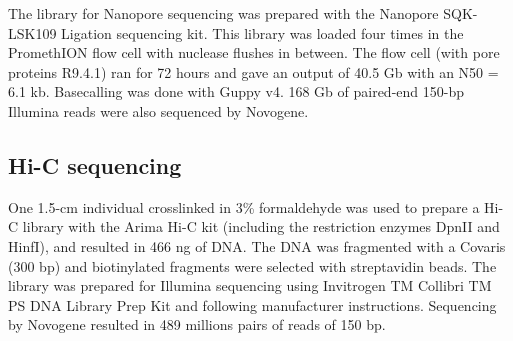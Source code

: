 The library for Nanopore sequencing was prepared with the Nanopore SQK-LSK109 Ligation sequencing kit. This library was loaded four times in the PromethION flow cell with nuclease flushes in between. The flow cell (with pore proteins R9.4.1) ran for 72 hours and gave an output of 40.5 Gb with an N50 = 6.1 kb. Basecalling was done with Guppy v4. 168 Gb of paired-end 150-bp Illumina reads were also sequenced by Novogene.




\subsection{Hi-C sequencing}

One 1.5-cm individual crosslinked in 3\% formaldehyde was used to prepare a Hi-C library with the Arima Hi-C kit (including the restriction enzymes DpnII and HinfI), and resulted in 466 ng of DNA. The DNA was fragmented with a Covaris (300 bp) and biotinylated fragments were selected with streptavidin beads. The library was prepared for Illumina sequencing using Invitrogen TM Collibri TM PS DNA Library Prep Kit and following manufacturer instructions. Sequencing by Novogene resulted in 489 millions pairs of reads of 150 bp.

